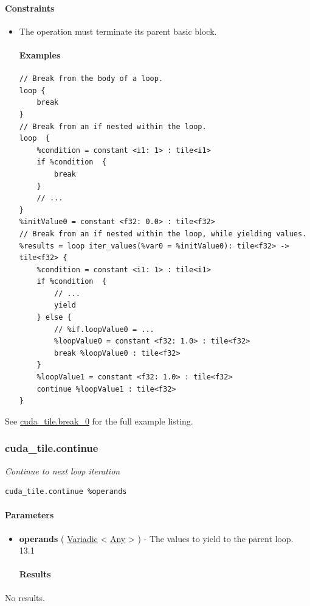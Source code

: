 \documentclass{article}
\begin{document}
\paragraph{Constraints}

\begin{itemize}
\item The operation must terminate its parent basic block.


\paragraph{Examples}

\begin{lstlisting}
// Break from the body of a loop.
loop {
    break
}
// Break from an if nested within the loop.
loop  {
    %condition = constant <i1: 1> : tile<i1>
    if %condition  {
        break
    }
    // ...
}
%initValue0 = constant <f32: 0.0> : tile<f32>
// Break from an if nested within the loop, while yielding values.
%results = loop iter_values(%var0 = %initValue0): tile<f32> -> tile<f32> {
    %condition = constant <i1: 1> : tile<i1>
    if %condition  {
        // ...
        yield
    } else {
        // %if.loopValue0 = ...
        %loopValue0 = constant <f32: 1.0> : tile<f32>
        break %loopValue0 : tile<f32>
    }
    %loopValue1 = constant <f32: 1.0> : tile<f32>
    continue %loopValue1 : tile<f32>
}
\end{lstlisting}

\end{itemize}
See \href{https://docs.nvidia.com/cuda/tile-ir/latest/sections/appendix.html#example-cuda-tile-break-0}{cuda\_tile.break\_0} for the full example listing.



\subsubsection{cuda\_tile.continue}

\textit{Continue to next loop iteration}


\begin{lstlisting}
cuda_tile.continue %operands
\end{lstlisting}

\paragraph{Parameters}

\begin{itemize}
\item \textbf{operands} ( \href{https://docs.nvidia.com/cuda/tile-ir/latest/sections/operations.html#type-variadic}{Variadic} < \href{https://docs.nvidia.com/cuda/tile-ir/latest/sections/operations.html#type-any}{Any} > ) - The values to yield to the parent loop. 13.1


\paragraph{Results}

\end{itemize}
No results.
\end{document}
